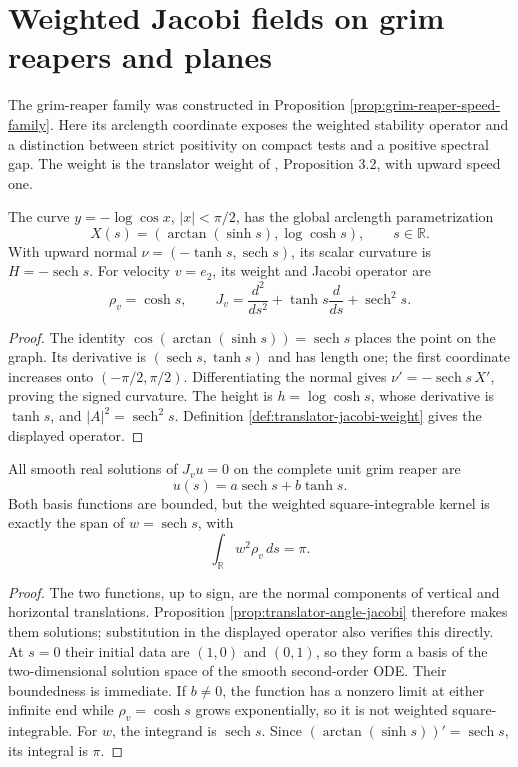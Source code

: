 \chapter{Weighted Jacobi fields on grim reapers and planes}\label{sec:examples-translator-jacobi}
The grim-reaper family was constructed in Proposition \ref{prop:grim-reaper-speed-family}. Here its arclength coordinate exposes the weighted stability operator and a distinction between strict positivity on compact tests and a positive spectral gap. The weight is the translator weight of \cite{HIMW19}, Proposition 3.2, with upward speed one.

\begin{proposition}\label{prop:grim-arclength-weight}
The curve $y=-\log\cos x$, $|x|<\pi/2$, has the global arclength parametrization
\[
 X(s)=(\arctan(\sinh s),\log\cosh s),\qquad s\in\mathbb R.
\]
With upward normal $\nu=(-\tanh s,\operatorname{sech}s)$, its scalar curvature is $H=-\operatorname{sech}s$. For velocity $v=e_2$, its weight and Jacobi operator are
\[
 \rho_v=\cosh s,\qquad J_v=\frac{d^2}{ds^2}+\tanh s\frac d{ds}+\operatorname{sech}^2s.
\]
\end{proposition}
\begin{proof}
The identity $\cos(\arctan(\sinh s))=\operatorname{sech}s$ places the point on the graph. Its derivative is $(\operatorname{sech}s,\tanh s)$ and has length one; the first coordinate increases onto $(-\pi/2,\pi/2)$. Differentiating the normal gives $\nu'=-\operatorname{sech}s\,X'$, proving the signed curvature. The height is $h=\log\cosh s$, whose derivative is $\tanh s$, and $|A|^2=\operatorname{sech}^2s$. Definition \ref{def:translator-jacobi-weight} gives the displayed operator.
\end{proof}

\begin{proposition}\label{prop:grim-jacobi-kernel}
All smooth real solutions of $J_vu=0$ on the complete unit grim reaper are
\[
 u(s)=a\operatorname{sech}s+b\tanh s.
\]
Both basis functions are bounded, but the weighted square-integrable kernel is exactly the span of $w=\operatorname{sech}s$, with
\[
 \int_{\mathbb R}w^2\rho_v\,ds=\pi.
\]
\end{proposition}
\begin{proof}
The two functions, up to sign, are the normal components of vertical and horizontal translations. Proposition \ref{prop:translator-angle-jacobi} therefore makes them solutions; substitution in the displayed operator also verifies this directly. At $s=0$ their initial data are $(1,0)$ and $(0,1)$, so they form a basis of the two-dimensional solution space of the smooth second-order ODE. Their boundedness is immediate. If $b\ne0$, the function has a nonzero limit at either infinite end while $\rho_v=\cosh s$ grows exponentially, so it is not weighted square-integrable. For $w$, the integrand is $\operatorname{sech}s$. Since $(\arctan(\sinh s))'=\operatorname{sech}s$, its integral is $\pi$.
\end{proof}

